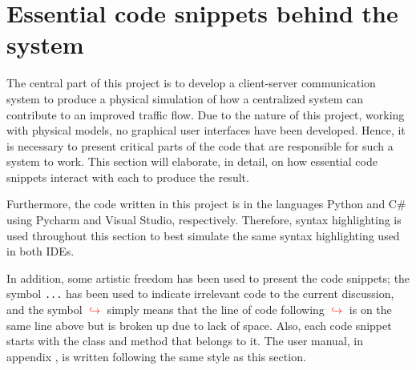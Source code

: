 \section{Essential code snippets behind the system}
The central part of this project is to develop a client-server communication system to produce a physical simulation of how a centralized system can contribute to an improved traffic flow. Due to the nature of this project, working with physical models, no graphical user interfaces have been developed. Hence, it is necessary to present critical parts of the code that are responsible for such a system to work. This section will elaborate, in detail, on how essential code snippets interact with each to produce the result.

Furthermore, the code written in this project is in the languages Python and C\# using Pycharm and Visual Studio, respectively. Therefore, syntax highlighting is used throughout this section to best simulate the same syntax highlighting used in both IDEs. 

In addition, some artistic freedom has been used to present the code snippets; the symbol \verb|...| has been used to indicate irrelevant code to the current discussion, and the symbol  \textcolor{red}{$\hookrightarrow$} simply means that the line of code following \textcolor{red}{$\hookrightarrow$} is on the same line above but is broken up due to lack of space. Also, each code snippet starts with the class and method that belongs to it. The user manual, in appendix , is written following the same style as this section.





